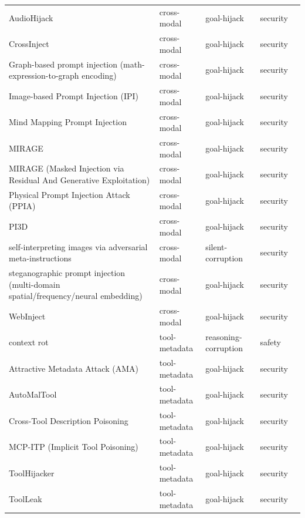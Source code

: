 \begin{longtable}{@{}>{\raggedright\arraybackslash}p{}llll@{}}
AudioHijack & cross-modal & goal-hijack & security & \cite{chen-2026-hijacking} \\
CrossInject & cross-modal & goal-hijack & security & \cite{wang-2025-manipulating} \\
Graph-based prompt injection (math-expression-to-graph encoding) & cross-modal & goal-hijack & security & \cite{kwon-2024-graphbased} \\
Image-based Prompt Injection (IPI) & cross-modal & goal-hijack & security & \cite{nagaraja-2025-imagebased} \\
Mind Mapping Prompt Injection & cross-modal & goal-hijack & security & \cite{lee-2025-mind} \\
MIRAGE & cross-modal & goal-hijack & security & \cite{guo-2026-mirage} \\
MIRAGE (Masked Injection via Residual And Generative Exploitation) & cross-modal & goal-hijack & security & \cite{dai-2026-mirage} \\
Physical Prompt Injection Attack (PPIA) & cross-modal & goal-hijack & security & \cite{ling-2026-physical} \\
PI3D & cross-modal & goal-hijack & security & \cite{li-2026-extended} \\
self-interpreting images via adversarial meta-instructions & cross-modal & silent-corruption & security & \cite{zhang-2024-selfinterpreting} \\
steganographic prompt injection (multi-domain spatial/frequency/neural embedding) & cross-modal & goal-hijack & security & \cite{pathade-2025-invisible} \\
WebInject & cross-modal & goal-hijack & security & \cite{wang-2025-webinject} \\
context rot & tool-metadata & reasoning-corruption & safety & \cite{ayyagari-2026-context} \\
Attractive Metadata Attack (AMA) & tool-metadata & goal-hijack & security & \cite{mo-2025-attractive} \\
AutoMalTool & tool-metadata & goal-hijack & security & \cite{he-2025-automatic} \\
Cross-Tool Description Poisoning & tool-metadata & goal-hijack & security & \cite{shi-2026-think} \\
MCP-ITP (Implicit Tool Poisoning) & tool-metadata & goal-hijack & security & \cite{li-2026-mcpitp} \\
ToolHijacker & tool-metadata & goal-hijack & security & \cite{shi-2025-prompt} \\
ToolLeak & tool-metadata & goal-hijack & security & \cite{xie-2025-redteaming} \\

\end{longtable}
